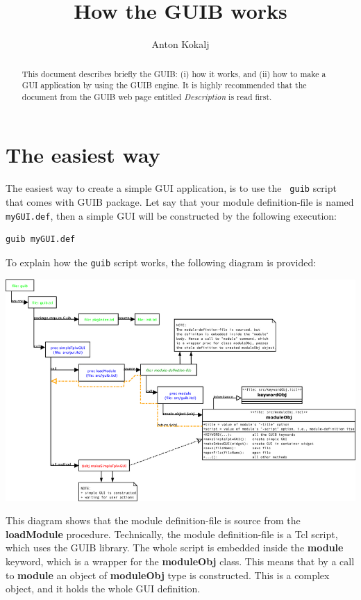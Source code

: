 \documentclass[12pt]{article}
\def\key#1{{\bf #1}}
\begin{document}
\title{How the GUIB works}
\author{Anton Kokalj}
\maketitle
\begin{abstract}
  This document describes briefly the GUIB: (i) how it works, and (ii)
  how to make a GUI application by using the GUIB engine. It is highly
  recommended that the document from the GUIB web page entitled {\em
    Description} is read first.
  \\[1em]
\end{abstract}

\tableofcontents

\section{The easiest way}

The easiest way to create a simple GUI application, is to use the {\tt
  guib} script that comes with GUIB package. Let say that your module
definition-file is named {\tt myGUI.def}, then a simple GUI will be
constructed by the following execution: 
\begin{verbatim}
guib myGUI.def 
\end{verbatim}

To explain how the {\tt guib} script works, the following diagram is
provided:

\includegraphics[width=1.0\textwidth]{diagrams/Guib.png}

This diagram shows that the module definition-file is source from the
\key{loadModule} procedure. Technically, the module definition-file is
a Tcl script, which uses the GUIB library. The whole script is
embedded inside the \key{module} keyword, which is a wrapper for the
\key{moduleObj} class. This means that by a call to \key{module} an
object of \key{moduleObj} type is constructed. This is a complex
object, and it holds the whole GUI definition.
\end{document}
